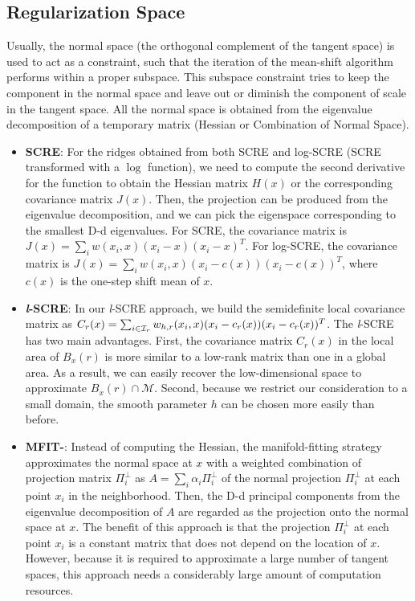 \documentclass[aos,preprint]{imsart}
\theoremstyle{remark}
\begin{document}
\begin{appendix}
\subsection{Regularization Space}
Usually, the normal space (the orthogonal complement of the tangent space) is used to act as a constraint, such that the iteration of the mean-shift algorithm performs within a proper subspace. This subspace constraint tries to keep the component in the normal space and leave out or diminish the component of scale in the tangent space. All the normal space is obtained from the eigenvalue decomposition of a temporary matrix (Hessian or Combination of Normal Space).
\begin{itemize}
\item{\bf SCRE}:  For the ridges obtained from both SCRE and {log}-SCRE (SCRE transformed with a $\log$ function), we need to compute the second derivative for the function to obtain the Hessian matrix $H(x)$ or the corresponding covariance matrix $J(x)$. Then, the projection can be produced from the eigenvalue decomposition, and we can pick the eigenspace corresponding to the smallest D-d eigenvalues. For SCRE, the covariance matrix is $J(x) = \sum_i w(x_i,x)(x_i-x)(x_i-x)^T$. For {log}-SCRE, the covariance matrix is $J(x) = \sum_i w(x_i,x)(x_i-c(x))(x_i-c(x))^T$, where $c(x)$ is the one-step shift mean of $x$.

\item{\bf {\it l}-SCRE}: In our {\it l}-SCRE approach, we build the semidefinite local covariance matrix as $C_{r}(x)=\sum_{i\in {\cal I}_r} w_{h,r}(x_i, x)(x_i-c_r(x))(x_i-c_r(x))^T$. The {\it l}-SCRE has two main advantages. First, the covariance matrix $C_{r}(x)$ in the local area of $B_{{x}}(r)$ is more similar to a low-rank matrix than one in a global area. As a result, we can easily recover the low-dimensional space to approximate $B_{{x}}(r)\cap \mathcal M$. Second, because we restrict our consideration to a small domain, the smooth parameter $h$ can be chosen more easily than before.

\item{\bf MFIT-}: Instead of computing the Hessian, the manifold-fitting strategy \cite{fefferman2018fitting}  approximates the normal space at ${x}$ with a weighted combination of projection matrix $\Pi_i^{\perp}$ as $A = \sum_i \alpha_i \Pi_i^{\perp}$ of the normal projection $\Pi_i^{\perp}$ at each point $x_i$ in the neighborhood. Then, the D-d principal components from the eigenvalue decomposition of $A$ are regarded as the projection onto the normal space at ${x}$. The benefit of this approach is that the projection $\Pi_i^{\perp}$ at each point $x_i$ is a constant matrix that does not depend on the location of ${x}$. However, because it is required to approximate a large number of tangent spaces, this approach needs a considerably large amount of computation resources.


\end{itemize}
\end{appendix}
\end{document}
